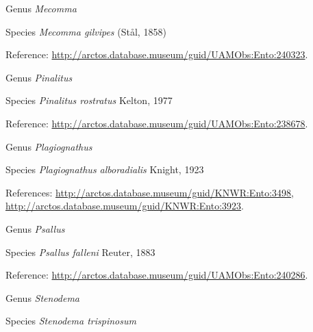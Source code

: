 \documentclass[9pt, article]{memoir}
\begin{document}
\begin{multicols}{2}
\vspace{6pt}\noindent\hspace{30pt}Genus \textit{Mecomma}


\vspace{6pt}\noindent\hspace{36pt}Species \textit{Mecomma gilvipes} (Stål, 1858)


\vspace{6pt}Reference: 
\url{http://arctos.database.museum/guid/UAMObs:Ento:240323}.

\vspace{6pt}\noindent\hspace{30pt}Genus \textit{Pinalitus}


\vspace{6pt}\noindent\hspace{36pt}Species \textit{Pinalitus rostratus} Kelton, 1977


\vspace{6pt}Reference: 
\url{http://arctos.database.museum/guid/UAMObs:Ento:238678}.

\vspace{6pt}\noindent\hspace{30pt}Genus \textit{Plagiognathus}


\vspace{6pt}\noindent\hspace{36pt}Species \textit{Plagiognathus alboradialis} Knight, 1923


\vspace{6pt}References: 
\url{http://arctos.database.museum/guid/KNWR:Ento:3498}, 
\url{http://arctos.database.museum/guid/KNWR:Ento:3923}.

\vspace{6pt}\noindent\hspace{30pt}Genus \textit{Psallus}


\vspace{6pt}\noindent\hspace{36pt}Species \textit{Psallus falleni} Reuter, 1883


\vspace{6pt}Reference: 
\url{http://arctos.database.museum/guid/UAMObs:Ento:240286}.

\vspace{6pt}\noindent\hspace{30pt}Genus \textit{Stenodema}


\vspace{6pt}\noindent\hspace{36pt}Species \textit{Stenodema trispinosum}



\end{multicols}
\end{document}
